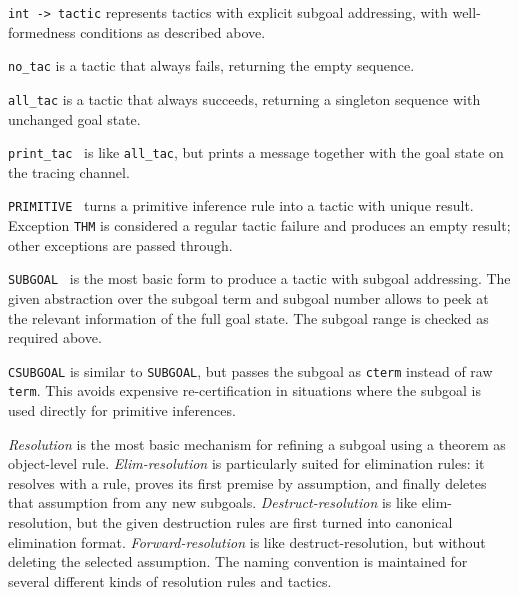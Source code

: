 \begin{isabellebody}
\begin{isamarkuptext}
\begin{description}
  \item \verb|int -> tactic| represents tactics with explicit
  subgoal addressing, with well-formedness conditions as described
  above.

  \item \verb|no_tac| is a tactic that always fails, returning the
  empty sequence.

  \item \verb|all_tac| is a tactic that always succeeds, returning a
  singleton sequence with unchanged goal state.

  \item \verb|print_tac|~ is like \verb|all_tac|, but
  prints a message together with the goal state on the tracing
  channel.

  \item \verb|PRIMITIVE|~ turns a primitive inference rule
  into a tactic with unique result.  Exception \verb|THM| is considered
  a regular tactic failure and produces an empty result; other
  exceptions are passed through.

  \item \verb|SUBGOAL|~ is the
  most basic form to produce a tactic with subgoal addressing.  The
  given abstraction over the subgoal term and subgoal number allows to
  peek at the relevant information of the full goal state.  The
  subgoal range is checked as required above.

  \item \verb|CSUBGOAL| is similar to \verb|SUBGOAL|, but passes the
  subgoal as \verb|cterm| instead of raw \verb|term|.  This
  avoids expensive re-certification in situations where the subgoal is
  used directly for primitive inferences.

  \end{description}%
\end{isamarkuptext}%
\isamarkuptrue%
%
\endisatagmlref
{\isafoldmlref}%
%
\isadelimmlref
%
\endisadelimmlref
%
\isamarkuptrue%
%
\begin{isamarkuptext}%
\emph{Resolution} is the most basic mechanism for refining a
  subgoal using a theorem as object-level rule.
  \emph{Elim-resolution} is particularly suited for elimination rules:
  it resolves with a rule, proves its first premise by assumption, and
  finally deletes that assumption from any new subgoals.
  \emph{Destruct-resolution} is like elim-resolution, but the given
  destruction rules are first turned into canonical elimination
  format.  \emph{Forward-resolution} is like destruct-resolution, but
  without deleting the selected assumption.  The 
  naming convention is maintained for several different kinds of
  resolution rules and tactics.


\end{isamarkuptext}
\end{isabellebody}
